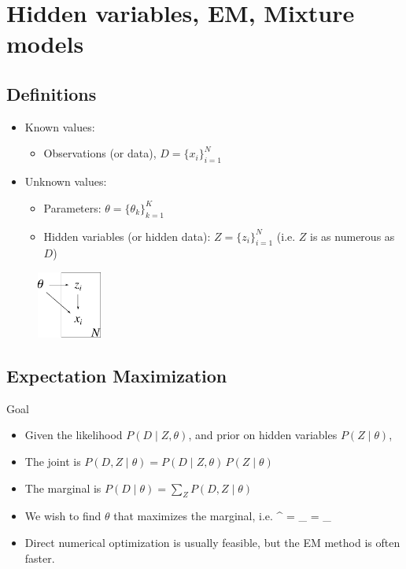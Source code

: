 \newpage
\section{Hidden variables, EM, Mixture models}
\label{sec:EM}


\subsection{Definitions}
\begin{itemize}
	\item Known values: 
		\begin{itemize}
			\item Observations (or data), $D = \{x_i\}_{i=1}^N$
		\end{itemize}
	\item Unknown values: 
		\begin{itemize}
			\item Parameters: $\theta = \{\theta_k\}_{k=1}^K$
			\item Hidden variables (or hidden data): $Z = \{z_i\}_{i=1}^N$ (i.e. $Z$ is as numerous as $D$)
		\end{itemize}
\end{itemize}
\begin{figure}[h]
\centering
	\includegraphics[height=22mm]{./figs/05-DZtheta.pdf}
\end{figure}

\subsection{Expectation Maximization}
\no Goal
\begin{itemize}
	\item Given the likelihood $P(D\;|\;Z, \theta)$, and prior on hidden variables $P(Z\;|\;\theta)$,
	\item The joint is $P(D, Z\;|\;\theta) = P(D\;|\;Z, \theta)\, P(Z\;|\;\theta)$
	\item The marginal is $P(D\;|\;\theta) = \sum_Z P(D, Z\;|\;\theta)$
	\item We wish to find $\theta$ that maximizes the marginal, i.e.
	\be
		\theta^ = \amax_{\theta}  = \amax_{\theta} 
	\ee
	\item Direct numerical optimization is usually feasible, but the EM method is often faster.
\end{itemize}


